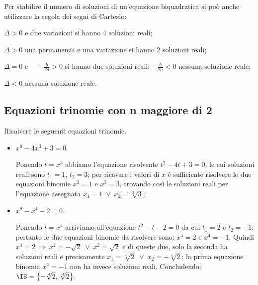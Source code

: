 Per stabilire il numero di soluzioni di un'equazione biquadratica si può anche utilizzare la regola dei segni di Cartesio:
\begin{itemize*}
\item $\Delta >0$ e due variazioni si hanno 4 soluzioni reali;
\item $\Delta >0$ una permanenza e una variazione si hanno 2 soluzioni reali;
\item $\Delta =0$ e~~~$-\frac b{2a}>0$ si hanno due soluzioni reali; $-\frac b{2a}<0$ nessuna soluzione reale;
\item $\Delta <0$ nessuna soluzione reale.
\end{itemize*}

\ovalbox{\risolvii \ref{ese:5.21}, \ref{ese:5.22}, \ref{ese:5.23}, \ref{ese:5.24}, \ref{ese:5.25}, \ref{ese:5.26}, \ref{ese:5.27}, \ref{ese:5.28}, \ref{ese:5.29}, \ref{ese:5.30}, \ref{ese:5.31}}

\subsection{Equazioni trinomie con n maggiore di 2}

\begin{exrig}
\begin{esempio}
Risolvere le seguenti equazioni trinomie.
\begin{itemize}
\item $ x^6-4x^3+3=0 $.

Ponendo $t=x^3$ abbiamo l'equazione risolvente $t^2-4t+3=0$, le cui soluzioni reali sono $t_1=1$, $t_2=3$; per ricavare i valori di $x$ è sufficiente risolvere le due equazioni binomie $x^3=1$ e $x^3=3$, trovando così le soluzioni reali per l'equazione assegnata $x_1=1\;\vee\; x_2=\sqrt[3]3$;

\item $ x^8-x^4-2=0 $.

Ponendo $t=x^4$ arriviamo all'equazione $t^2-t-2=0$ da cui $t_1=2$ e $t_2=-1$; pertanto le due equazioni binomie da risolvere sono: $x^4=2$ e $x^4=-1$. Quindi $x^4=2\:\Rightarrow\: x^2=-\sqrt 2\;\vee\; x^2=\sqrt 2$ e di queste due, solo la seconda ha soluzioni reali e precisamente $x_1=\sqrt[4]2 \;\vee\; x_2=-\sqrt[4]2$; la prima equazione binomia $x^4=-1$ non ha invece soluzioni reali. Concludendo: $\IS=\left\{-\sqrt[4]2\text{, }\sqrt[4]2\right\}$.
\end{itemize}
\end{esempio}
\end{exrig}
\ovalbox{\risolvii \ref{ese:5.32}, \ref{ese:5.33}}


